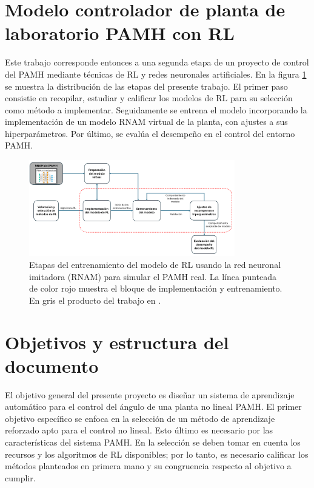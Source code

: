 \section{Modelo controlador de planta de laboratorio PAMH con RL}

Este trabajo corresponde entonces a una segunda etapa de un proyecto de control del PAMH mediante técnicas de RL y redes neuronales artificiales. En la figura \ref{fig:DiagEtapas} se muestra la distribución de las etapas del presente trabajo. El primer paso consistie en recopilar, estudiar y calificar los modelos de RL para su selección como método a implementar. Seguidamente se entrena el modelo incorporando la implementación de un modelo RNAM virtual de la planta, con ajustes a sus  hiperparámetros. Por último, se evalúa el desempeño en el control del entorno PAMH.

\begin{figure}[h]
    \centering
    \includegraphics[width=0.8\textwidth]{fig/new/DiagEtapas.png}
    \caption{Etapas del entrenamiento del modelo de RL usando la red neuronal imitadora (RNAM) para simular el PAMH real. La línea punteada de color rojo muestra el bloque de implementación y entrenamiento. En gris el producto del trabajo en \cite{JorgeBrenes}.}
    \label{fig:DiagEtapas}
\end{figure}


\section{Objetivos y estructura del documento}

El objetivo general del presente proyecto es diseñar un sistema de aprendizaje automático para el control del ángulo de una planta no lineal PAMH. El primer objetivo específico se enfoca en la selección de un método de aprendizaje reforzado apto para el control no lineal. Esto último es necesario por las características del sistema PAMH. En la selección se deben tomar en cuenta los recursos y los algoritmos de RL disponibles; por lo tanto, es necesario calificar los métodos planteados en primera mano y su congruencia respecto al objetivo a cumplir.

